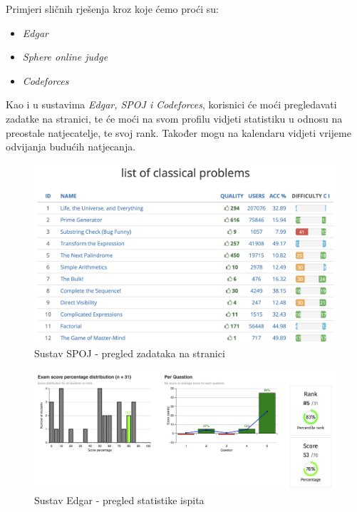 Primjeri sličnih rješenja kroz koje ćemo proći su:
		\begin{itemize}
			\item \textit{Edgar}
			\item \textit{Sphere online judge}
			\item \textit{Codeforces}
		\end{itemize}
		
		Kao i u sustavima \emph{Edgar, SPOJ i Codeforces}, korisnici će moći pregledavati zadatke na stranici, te će moći na svom profilu vidjeti statistiku u odnosu na preostale natjecatelje, te svoj rank. Također mogu na kalendaru vidjeti vrijeme odvijanja budućih natjecanja. 
		
		\begin{figure}[H]
			\includegraphics[scale=0.4]{slike/spoj1.png}
			\centering
			\caption{Sustav SPOJ - pregled zadataka na stranici}
			\label{fig:spoj1}
		\end{figure}
		
		\begin{figure}[H]
			\includegraphics[scale=0.4]{slike/edgar2.png}
			\caption{Sustav Edgar - pregled statistike ispita}
			\label{fig:edgar2}
		\end{figure}
		
